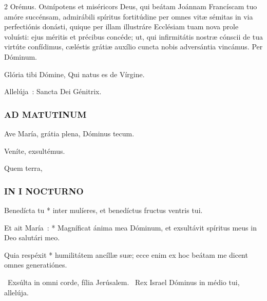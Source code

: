 \documentclass[9pt,twoside]{extarticle}
\begin{document}
\begin{multicols}{2}
\noindent Orémus. \hfill {}
\lettrine{O}mnípotens et miséricors Deus, qui beátam Joánnam Francíscam tuo amóre succénsam, admirábili spíritus fortitúdine per omnes vitæ sémitas in via perfectiónis donásti, quique per illam illustráre Ecclésiam tuam nova prole voluísti: ejus méritis et précibus concéde; ut, qui infirmitátis nostræ cónscii de tua virtúte confídimus, cæléstis grátiæ auxílio cuncta nobis adversántia vincámus. Per Dóminum.

\small {}


 Glória tibi Dómine, Qui natus es de Vírgine.

 Allelúja~: Sancta Dei Génitrix.
\normalsize

\subsubsection*{\center \normalfont \textsc{AD MATUTINUM}}
\indent {}

 Ave María, grátia plena, \textred{*} Dóminus tecum.

 Veníte, exsultémus. 

{\small {} Quem terra, }

\subsubsection*{\center \normalfont \small \textsc{IN I NOCTURNO}}

\smallskip
{} Benedícta tu * inter mulíeres, et benedíctus fructus ventris tui.

{\small {}}

 Et ait María~: * Magníficat ánima mea Dóminum, et exsultávit spíritus meus in Deo salutári meo.

 Quia respéxit * humilitátem ancíllæ suæ; ecce enim ex hoc beátam me dicent omnes generatiónes.

\smallskip
{}~Exsúlta in omni corde, fília Jerúsalem. ~Rex Israel Dóminus in médio tui, allelúja.


\end{multicols}
\end{document}
